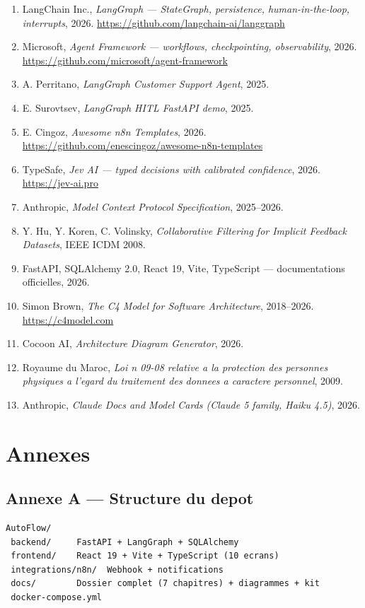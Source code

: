 \documentclass[12pt,a4paper,openany]{report}
\begin{document}
\begin{enumerate}[leftmargin=1.6em, itemsep=3pt]
\item LangChain Inc., \emph{LangGraph --- StateGraph, persistence, human-in-the-loop, interrupts}, 2026. \url{https://github.com/langchain-ai/langgraph}
\item Microsoft, \emph{Agent Framework --- workflows, checkpointing, observability}, 2026. \url{https://github.com/microsoft/agent-framework}
\item A. Perritano, \emph{LangGraph Customer Support Agent}, 2025.
\item E. Surovtsev, \emph{LangGraph HITL FastAPI demo}, 2025.
\item E. Cingoz, \emph{Awesome n8n Templates}, 2026. \url{https://github.com/enescingoz/awesome-n8n-templates}
\item TypeSafe, \emph{Jev AI --- typed decisions with calibrated confidence}, 2026. \url{https://jev-ai.pro}
\item Anthropic, \emph{Model Context Protocol Specification}, 2025--2026.
\item Y. Hu, Y. Koren, C. Volinsky, \emph{Collaborative Filtering for Implicit Feedback Datasets}, IEEE ICDM 2008.
\item FastAPI, SQLAlchemy 2.0, React 19, Vite, TypeScript --- documentations officielles, 2026.
\item Simon Brown, \emph{The C4 Model for Software Architecture}, 2018--2026. \url{https://c4model.com}
\item Cocoon AI, \emph{Architecture Diagram Generator}, 2026.
\item Royaume du Maroc, \emph{Loi n\textdegree{} 09-08 relative a la protection des personnes physiques a l'egard du traitement des donnees a caractere personnel}, 2009.
\item Anthropic, \emph{Claude Docs and Model Cards (Claude 5 family, Haiku 4.5)}, 2026.
\end{enumerate}

\appendix
\chapter{Annexes}

\section*{Annexe A --- Structure du depot}
\begin{lstlisting}
AutoFlow/
 backend/     FastAPI + LangGraph + SQLAlchemy
 frontend/    React 19 + Vite + TypeScript (10 ecrans)
 integrations/n8n/  Webhook + notifications
 docs/        Dossier complet (7 chapitres) + diagrammes + kit
 docker-compose.yml
\end{lstlisting}
\end{document}
